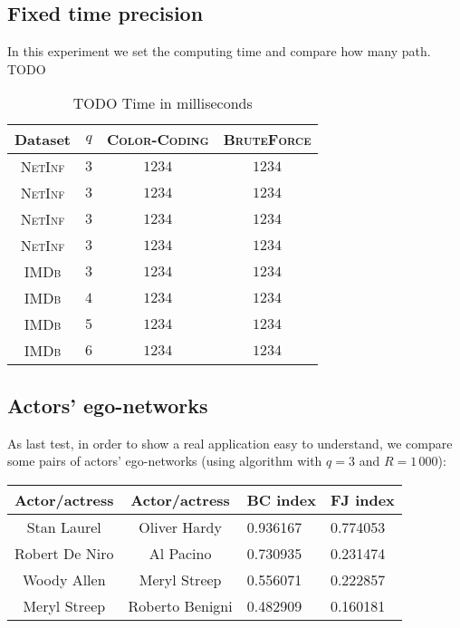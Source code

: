 	\subsection*{Fixed time precision}
	
	In this experiment we set the computing time and compare how many path.\\
	
	TODO
	\begin{table}[h]
		\centering
		\label{my-label}
		\begin{tabular}{|c|c|c|c|}
			\hline
			Dataset 		& $q$ & \textsc{Color-Coding} 	& \textsc{BruteForce} \\ \hline
			\textsc{NetInf}	& $3$ & $1234$					& $1234$ \\ \hline
			\textsc{NetInf}	& $3$ & $1234$					& $1234$ \\ \hline
			\textsc{NetInf}	& $3$ & $1234$					& $1234$ \\ \hline
			\textsc{NetInf}	& $3$ & $1234$					& $1234$ \\ \hline
			\textsc{IMDb}	& $3$ & $1234$					& $1234$ \\ \hline
			\textsc{IMDb}	& $4$ & $1234$					& $1234$ \\ \hline
			\textsc{IMDb}	& $5$ & $1234$					& $1234$ \\ \hline
			\textsc{IMDb}	& $6$ & $1234$					& $1234$ \\ \hline
		\end{tabular}
		\caption{TODO Time in milliseconds}
	\end{table}

	\subsection*{Actors' ego-networks}
	
	As last test, in order to show a real application easy to understand, we compare
	some pairs of actors' ego-networks (using \fcount algorithm with $q=3$ and $R=1\,000$):
	
	\begin{table}[h]
		\centering
		\begin{tabular}{c|c|l|l}
			Actor/actress & Actor/actress & BC index & FJ index\\ 
			\hline
			Stan Laurel & Oliver Hardy & 0.936167 & 0.774053 \\
			Robert De Niro & Al Pacino & 0.730935 & 0.231474\\
			Woody Allen & Meryl Streep & 0.556071 & 0.222857\\
			Meryl Streep & Roberto Benigni & 0.482909 & 0.160181\\
		\end{tabular}
	\end{table}

